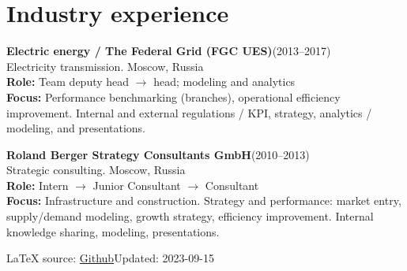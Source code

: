 \documentclass[11pt, a4paper]{article} \usepackage{geometry} %
\newcommand{\jobl}[5]{%
  \textbf{#1}\hfill (#2)\\
  #3\vspace{0.25em}\\
  \textbf{Role:} #4\\
  \textbf{Focus:} #5}
\newcommand{\job}[5]{%
  \jobl{#1}{#2}{#3}{#4}{#5}\vspace{0.5em}
}
\begin{document}
   \section*{Industry experience}
   \job{Electric energy / The Federal Grid (FGC UES)}{2013--2017}{Electricity transmission.
     Moscow, Russia}{Team deputy head $\rightarrow$ head; modeling and analytics}{Performance
     benchmarking (branches), operational efficiency improvement. Internal
     and external regulations / KPI, strategy, analytics / modeling, and presentations.}

   \noindent
   \job{Roland Berger Strategy Consultants GmbH}{2010--2013}{Strategic consulting.
     Moscow, Russia}{ Intern $\rightarrow$ Junior
     Consultant $\rightarrow$ Consultant}{Infrastructure and construction.
     Strategy and performance: market entry, supply/demand modeling, growth
     strategy, efficiency improvement. Internal knowledge sharing, modeling, presentations.}
   {%
   \vfill\noindent\tiny\LaTeX{} source: \href{https://github.com/alex-bochkarev/AB-CV}{Github}\hfill  Updated: 2023-09-15}
\end{document}
